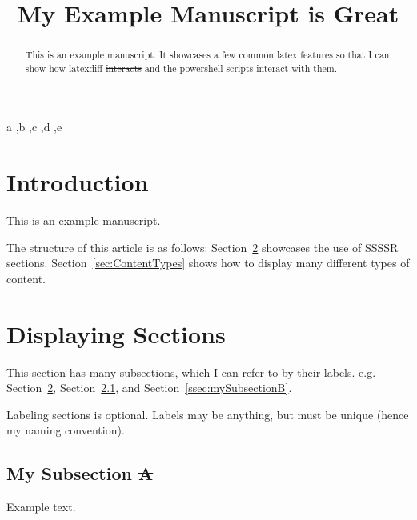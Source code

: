 \documentclass[preprint,3p,11pt,sort]{elsarticle}
\makeatletter
\newcommand{\secref}[1]{Section~\ref{#1}}
\providecommand{\DIFaddtex}[1]{{\protect\color{difBlue}#1}} %
\providecommand{\DIFdeltex}[1]{{\protect\color{difRed}\sout{#1}}} %
\providecommand{\DIFadd}[1]{\texorpdfstring{\DIFaddtex{#1}}{#1}} %
\providecommand{\DIFdel}[1]{\texorpdfstring{\DIFdeltex{#1}}{}} %
\let\sout@orig\sout %
\renewcommand{\sout}[1]{\ifmmode\text{\sout@orig{\ensuremath{#1}}}\else\sout@orig{#1}\fi} %
\makeatother
\begin{document}
\begin{frontmatter}

\title{My Example Manuscript  \DIFadd{is Great} }

 

\begin{abstract}
    This is an example manuscript. It showcases a few common latex features so that I can show how latexdiff  \DIFdel{interacts }  \DIFadd{and the powershell scripts interact } with them.
\end{abstract}

\begin{keyword}
    a \sep b \sep c \sep d  \sep \DIFadd{e
} \end{keyword}

\end{frontmatter}

\section{Introduction} \label{sec:intro}
This is an example manuscript.

The structure of this article is as follows: \secref{sec:mySection} showcases the use of SSSSR sections. \secref{sec:ContentTypes} shows how to display many different types of content.


\section{Displaying Sections} \label{sec:mySection}
This section has many subsections, which I can refer to by their labels. e.g. \secref{sec:mySection}, \secref{ssec:mySubsectionA}, and \secref{ssec:mySubsectionB}.
 

 Labeling sections is optional. Labels may be anything, but must be unique (hence my naming convention).

\subsection{My Subsection \DIFdel{A} } \label{ssec:mySubsectionA}
Example text.
\end{document}
